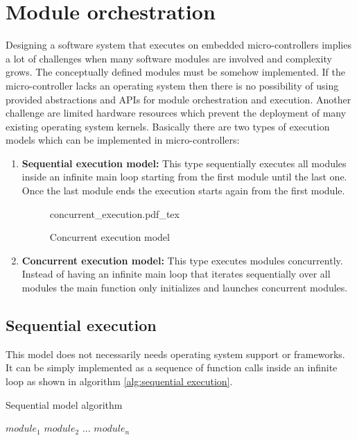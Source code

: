\section{Module orchestration}%
Designing a software system that executes on embedded micro-controllers implies a lot of challenges when many software modules are involved and complexity grows. The conceptually defined modules must be somehow implemented. If the micro-controller lacks an operating system then there is no possibility of using provided abstractions and APIs for module orchestration and execution. Another challenge are limited hardware resources which prevent the deployment of many existing operating system kernels. Basically there are two types of execution models which can be implemented in micro-controllers:

\begin{enumerate}

\begin{figure}[H]
    \centering
    {sequential_execution.pdf_tex}
    \caption{Sequential execution model}
\end{figure}

    \item \textbf{Sequential execution model:} This type sequentially executes all modules inside an infinite main loop starting from the first module until the last one. Once the last module ends the execution starts again from the first module.

\begin{figure}[H]
\centering
{concurrent_execution.pdf_tex}
\caption{Concurrent execution model}
\end{figure}
    \item \textbf{Concurrent execution model:} This type executes modules concurrently. Instead of having an infinite main loop that iterates sequentially over all modules the main function only initializes and launches concurrent modules.
\end{enumerate}

\subsection{Sequential execution}%
This model does not necessarily needs operating system support or frameworks. It can be simply implemented as a sequence of function calls inside an infinite loop as shown in algorithm \ref{alg:sequential execution}.

\begin{algorithm}[H]
\caption{Sequential model algorithm}
\label{alg:sequential execution}
\begin{algorithmic}
\STATE $module_1$
\STATE $module_2$
\STATE $...$
\STATE $module_n$
\ENDWHILE
\end{algorithmic}
\end{algorithm}

